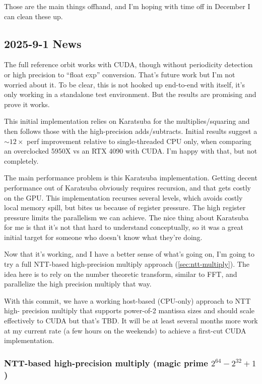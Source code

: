 Those are the main things offhand, and I'm hoping with time off in December I can clean these up.

\subsection{2025-9-1 News}

The full reference orbit works with CUDA, though without periodicity detection 
or high precision to ``float exp'' conversion.  That's future work but I'm not 
worried about it.  To be clear, this is not hooked up end-to-end with 
\FractalShark{} itself, it's only working in a standalone test environment.  But 
the results are promising and prove it works.

This initial implementation relies on Karatsuba for the multiplies/squaring and 
then follows those with the high-precision adds/subtracts.  Initial results 
suggest a $\sim 12\times$ perf improvement relative to single-threaded CPU 
only, when comparing an overclocked 5950X vs an RTX 4090 with CUDA.  I'm happy 
with that, but not completely.

The main performance problem is this Karatsuba implementation.  Getting decent 
performance out of Karatsuba obviously requires recursion, and that gets costly 
on the GPU.  This implementation recurses several levels, which avoids costly 
local memory spill, but bites us because of register pressure.  The high 
register pressure limits the parallelism we can achieve.  The nice thing about 
Karatsuba for me is that it's not that hard to understand conceptually, so it 
was a great initial target for someone who doesn't know what they're doing.

Now that it's working, and I have a better sense of what's going on, I'm going 
to try a full NTT-based high-precision multiply approach (\cref{sec:ntt-multiply}).  The idea here is to 
rely on the number theoretic transform, similar to FFT, and parallelize the 
high precision multiply that way.

With this commit, we have a working host-based (CPU-only) approach to NTT high-
precision multiply that supports power-of-2 mantissa sizes and should scale 
effectively to CUDA but that's TBD.  It will be at least several months more 
work at my current rate (a few hours on the weekends) to achieve a first-cut 
CUDA implementation.

\subsubsection{NTT-based high-precision multiply (magic prime \texorpdfstring{$2^{64} - 2^{32} + 1$}{2\^{}64 - 2\^{}32 + 1})}

